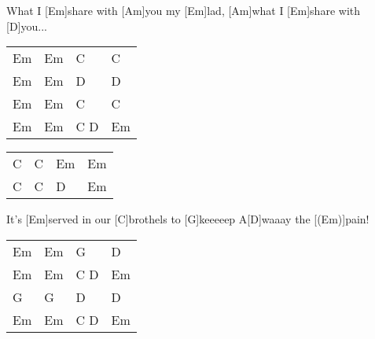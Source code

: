 \begin{guitar}
	[Am]What I [Em]share with [Am]you my [Em]lad, [Am]what I [Em]share with [D]you...
	
	{\footnotesize\begin{tabular}{|l|l|l|l|}
			Em & Em & C & C \\
			Em & Em & D & D \\
			Em & Em & C & C \\
			Em & Em & C D & Em 
	\end{tabular}} 

	{\footnotesize\begin{tabular}{|l|l|l|l|}
			C & C & Em & Em \\
			C & C & D & Em
	\end{tabular}} 
	
	\begin{highlightbar}
		 
		It's [Em]served in our [C]brothels to [G]keeeeep 
		A[D]waaay the [(Em)]pain! 
	\end{highlightbar}
	
	{\footnotesize\begin{tabular}{|l|l|l|l|}
			Em & Em & G & D \\
			Em & Em & C D & Em\\
			G & G & D & D\\
			Em & Em & C D & Em 
	\end{tabular}}
\end{guitar}

